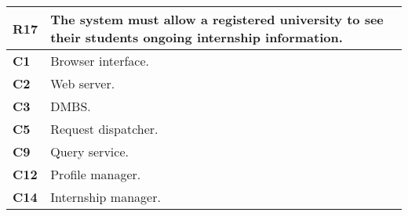 \begin{table}[H]
    \centering
    \begin{tabular}{|l|m{10cm}|}
        \hline \textbf{R17} & The system must allow a registered university to see their students ongoing internship information.\\
        \hline \textbf{C1} & Browser interface. \\
        \hline \textbf{C2} & Web server. \\
        \hline \textbf{C3} & DMBS. \\
        \hline \textbf{C5} & Request dispatcher. \\
        \hline \textbf{C9} & Query service. \\
        \hline \textbf{C12} & Profile manager.\\
        \hline \textbf{C14} & Internship manager. \\
        \hline
    \end{tabular}
\end{table}

